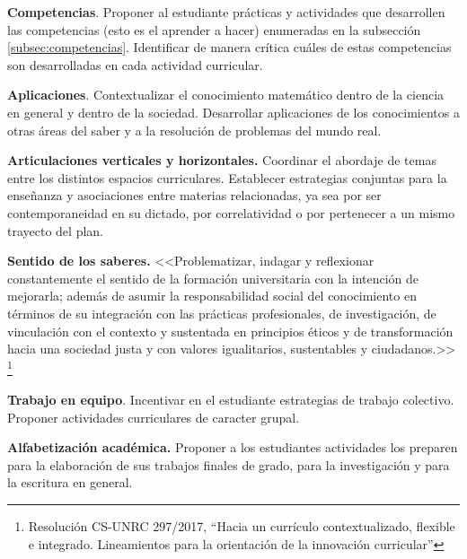 \documentclass[a4paper, 12pt]{article}
\begin{document}
\begin{description}
  



\item{\textbf{Competencias}.} Proponer al estudiante prácticas y actividades que desarrollen las competencias (esto es el aprender a hacer) enumeradas en la subsección \ref{subsec:competencias}. Identificar de manera crítica cuáles de estas competencias son desarrolladas en cada actividad curricular.


\item{\textbf{Aplicaciones}.}  Contextualizar el conocimiento matemático dentro de la ciencia en general y dentro de la sociedad. Desarrollar aplicaciones de los conocimientos a otras áreas del saber y a la resolución de problemas del mundo real. 



\item{\textbf{Articulaciones verticales y horizontales.}} Coordinar el abordaje de  temas entre los distintos espacios curriculares. Establecer estrategias conjuntas para la enseñanza y asociaciones entre materias relacionadas, ya sea por ser contemporaneidad en su dictado, por correlatividad o por pertenecer a un mismo trayecto del plan. 


\item{ \textbf{Sentido de los saberes.}} <<Problematizar, indagar y reflexionar constantemente el sentido de la formación
universitaria con la intención de mejorarla; además de asumir la responsabilidad social del
conocimiento en términos de su integración con las prácticas profesionales, de investigación, de
vinculación con el contexto y sustentada en principios éticos y de transformación hacia una
sociedad justa y con valores igualitarios, sustentables y ciudadanos.>> \footnote{Resolución CS-UNRC 297/2017, ``Hacia   un   currículo contextualizado, flexible e integrado. Lineamientos para la orientación de la innovación  curricular''}

\item{\textbf{Trabajo en equipo}.} Incentivar en el estudiante estrategias de trabajo colectivo. Proponer actividades curriculares   de caracter  grupal.



\item{ \textbf{Alfabetización académica.}} Proponer a los estudiantes actividades los preparen para la
elaboración de sus trabajos finales de grado, para la investigación y para la escritura en general. 





\end{description}
\end{document}
